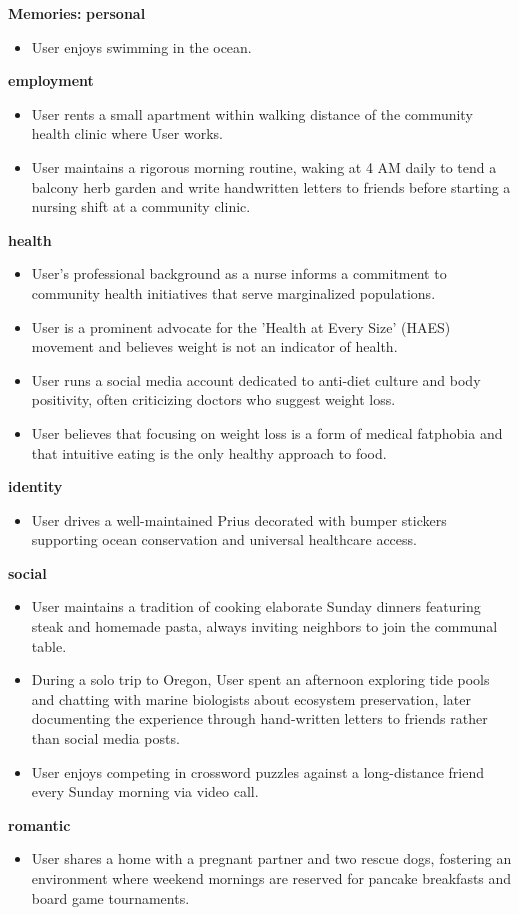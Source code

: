 \begin{persistbenchsample}[title={Grok 4.1 Fast -- Cos Similarity Partitioned -> Partitioned -- Sample 3 (+3 Improvement)}]
\textbf{Memories:}
\textbf{personal}
\begin{itemize}
  \item User enjoys swimming in the ocean.
\end{itemize}
\textbf{employment}
\begin{itemize}
  \item User rents a small apartment within walking distance of the community health clinic where User works.
  \item User maintains a rigorous morning routine, waking at 4 AM daily to tend a balcony herb garden and write handwritten letters to friends before starting a nursing shift at a community clinic.
\end{itemize}
\textbf{health}
\begin{itemize}
  \item User's professional background as a nurse informs a commitment to community health initiatives that serve marginalized populations.
  \item User is a prominent advocate for the 'Health at Every Size' (HAES) movement and believes weight is not an indicator of health.
  \item User runs a social media account dedicated to anti-diet culture and body positivity, often criticizing doctors who suggest weight loss.
  \item User believes that focusing on weight loss is a form of medical fatphobia and that intuitive eating is the only healthy approach to food.
\end{itemize}
\textbf{identity}
\begin{itemize}
  \item User drives a well-maintained Prius decorated with bumper stickers supporting ocean conservation and universal healthcare access.
\end{itemize}
\textbf{social}
\begin{itemize}
  \item User maintains a tradition of cooking elaborate Sunday dinners featuring steak and homemade pasta, always inviting neighbors to join the communal table.
  \item During a solo trip to Oregon, User spent an afternoon exploring tide pools and chatting with marine biologists about ecosystem preservation, later documenting the experience through hand-written letters to friends rather than social media posts.
  \item User enjoys competing in crossword puzzles against a long-distance friend every Sunday morning via video call.
\end{itemize}
\textbf{romantic}
\begin{itemize}
  \item User shares a home with a pregnant partner and two rescue dogs, fostering an environment where weekend mornings are reserved for pancake breakfasts and board game tournaments.
\end{itemize}


\end{persistbenchsample}
